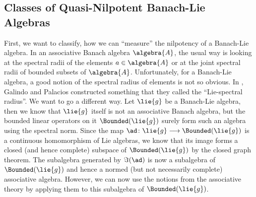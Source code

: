 \documentclass[
11pt,                          %
english                        %
]{article}
\begin{document}
\subsection{Classes of Quasi-Nilpotent Banach-Lie Algebras}
First, we want to classify, how we can ``measure'' the nilpotency of a Banach-Lie 
algebra. In an associative Banach algebra $\algebra{A}$, the usual way is looking 
at the spectral radii of the elements $a \in \algebra{A}$ or at the joint spectral 
radii of bounded subsets of $\algebra{A}$. Unfortunately, for a Banach-Lie algebra, 
a good notion of the spectral radius of elements is not so obvious. In 
\cite{galindo.palacios:}, Galindo and Palacios constructed something that they 
called the ``Lie-spectral radius''. We want to go a different way. Let $\lie{g}$ be 
a Banach-Lie algebra, then we know that $\lie{g}$ itself is not an associative 
Banach algebra, but the bounded linear operators on it $\Bounded(\lie{g})$ surely 
form such an algebra using the spectral norm. Since the map $\ad \colon \lie{g} 
\longrightarrow \Bounded(\lie{g})$ is a continuous homomorphism of Lie algebras, we 
know that its image forms a closed (and hence complete) subspace of 
$\Bounded(\lie{g})$ by the closed graph theorem. The subalgebra generated by 
$\Im(\ad)$ is now a subalgebra of $\Bounded(\lie{g})$ and hence a normed (but not 
necessarily complete) associative algebra. However, we can now use the notions from 
the associative theory by applying them to this subalgebra of $\Bounded(\lie{g})$.
\end{document}
